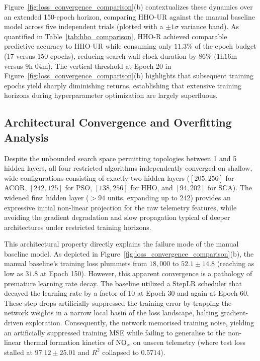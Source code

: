 \documentclass[runningheads]{llncs}
\begin{document}
Figure~\ref{fig:loss_convergence_comparison}(b) contextualizes these dynamics over an extended
150-epoch horizon, comparing HHO-UR against the manual baseline model across five independent trials
(plotted with a $\pm 1\sigma$ variance band). As quantified in Table~\ref{tab:hho_comparison},
HHO-R achieved comparable predictive accuracy to HHO-UR while consuming only $11.3\%$ of the epoch
budget (17 versus 150 epochs), reducing search wall-clock duration by $86\%$ ($1\text{h
}16\text{m}$ versus $9\text{h }04\text{m}$). The vertical threshold at Epoch 20 in
Figure~\ref{fig:loss_convergence_comparison}(b) highlights that subsequent training epochs yield
sharply diminishing returns, establishing that extensive training horizons during hyperparameter
optimization are largely superfluous.

\subsection{Architectural Convergence and Overfitting Analysis}

Despite the unbounded search space permitting topologies between 1
and 5 hidden layers, all four restricted algorithms independently converged on shallow, wide
configurations consisting of exactly two hidden layers ($[205, 256]$ for ACOR, $[242, 125]$ for
PSO, $[138, 256]$ for HHO, and $[94, 202]$ for SCA). The widened first hidden layer ($> 94$ units,
expanding up to 242) provides an expressive initial non-linear projection for the raw telemetry
features, while avoiding the gradient degradation and slow propagation typical of deeper
architectures under restricted training horizons.

This architectural property directly explains the failure mode of the manual baseline model. As
depicted in Figure~\ref{fig:loss_convergence_comparison}(b), the manual baseline's training loss
plummets from $18,000$ to $52.1 \pm 14.8$ (reaching as low as $31.8$ at Epoch 150). However, this
apparent convergence is a pathology of premature learning rate decay. The baseline utilized a
StepLR scheduler that decayed the learning rate by a factor of 10 at Epoch 30 and again at Epoch
60. These step drops artificially suppressed the training error by trapping the network weights in
a narrow local basin of the loss landscape, halting gradient-driven exploration. Consequently, the
network memorised training noise, yielding an artificially suppressed training MSE while failing to
generalise to the non-linear thermal formation kinetics of $\ce{NO_x}$ on unseen telemetry (where
test loss stalled at $97.12 \pm 25.01$ and $R^2$ collapsed to $0.5714$).
\end{document}
